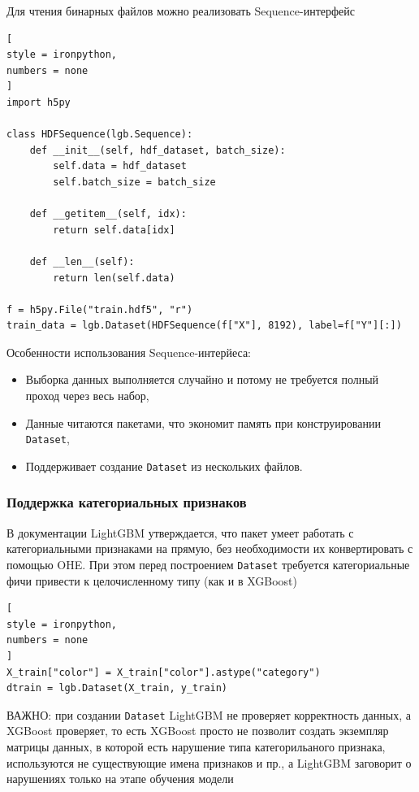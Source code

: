 \documentclass[%
	11pt,
	a4paper,
	utf8,
		]{article}
\begin{document}
Для чтения бинарных файлов можно реализовать Sequence-интерфейс
\begin{lstlisting}[
style = ironpython,
numbers = none
]
import h5py

class HDFSequence(lgb.Sequence):
    def __init__(self, hdf_dataset, batch_size):
        self.data = hdf_dataset
        self.batch_size = batch_size
        
    def __getitem__(self, idx):
        return self.data[idx]
        
    def __len__(self):
        return len(self.data)
        
f = h5py.File("train.hdf5", "r")
train_data = lgb.Dataset(HDFSequence(f["X"], 8192), label=f["Y"][:])
\end{lstlisting}

Особенности использования Sequence-интерйеса:
\begin{itemize}
	\item Выборка данных выполняется случайно и потому не требуется полный проход через весь набор,
	
	\item Данные читаются пакетами, что экономит память при конструировании \verb|Dataset|,
	
	\item Поддерживает создание \verb|Dataset| из нескольких файлов.
\end{itemize}

\subsubsection{Поддержка категориальных признаков}

В документации LightGBM утверждается, что пакет умеет работать с категориальными признаками на прямую, без необходимости их конвертировать с помощью OHE. При этом перед построением \verb|Dataset| требуется категориальные фичи привести к целочисленному типу (как и в XGBoost)
\begin{lstlisting}[
style = ironpython,
numbers = none
]
X_train["color"] = X_train["color"].astype("category")
dtrain = lgb.Dataset(X_train, y_train)
\end{lstlisting}

{\color{red}ВАЖНО: при создании \verb|Dataset| LightGBM не проверяет корректность данных, а XGBoost проверяет, то есть XGBoost просто не позволит создать экземпляр матрицы данных, в которой есть нарушение типа категорильаного признака, используются не существующие имена признаков и пр., а LightGBM заговорит о нарушениях только на этапе обучения модели}
\end{document}

